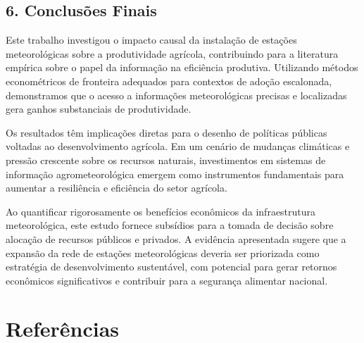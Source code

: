\documentclass[
  brazilian,
  12pt,
  a4paper,
]{article}
\begin{document}
\subsection{\texorpdfstring{\textbf{6. Conclusões
Finais}}{6. Conclusões Finais}}\label{conclusuxf5es-finais}

Este trabalho investigou o impacto causal da instalação de estações
meteorológicas sobre a produtividade agrícola, contribuindo para a
literatura empírica sobre o papel da informação na eficiência produtiva.
Utilizando métodos econométricos de fronteira adequados para contextos
de adoção escalonada, demonstramos que o acesso a informações
meteorológicas precisas e localizadas gera ganhos substanciais de
produtividade.

Os resultados têm implicações diretas para o desenho de políticas
públicas voltadas ao desenvolvimento agrícola. Em um cenário de mudanças
climáticas e pressão crescente sobre os recursos naturais, investimentos
em sistemas de informação agrometeorológica emergem como instrumentos
fundamentais para aumentar a resiliência e eficiência do setor agrícola.

Ao quantificar rigorosamente os benefícios econômicos da infraestrutura
meteorológica, este estudo fornece subsídios para a tomada de decisão
sobre alocação de recursos públicos e privados. A evidência apresentada
sugere que a expansão da rede de estações meteorológicas deveria ser
priorizada como estratégia de desenvolvimento sustentável, com potencial
para gerar retornos econômicos significativos e contribuir para a
segurança alimentar nacional.

\section{Referências}\label{referuxeancias}
\end{document}
